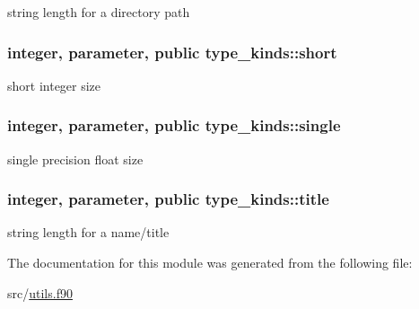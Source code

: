 string length for a directory path 

\hypertarget{classtype__kinds_ab4d7bfce672e6152e78f87f8aa5b2e04}{
\subsubsection[{short}]{\setlength{\rightskip}{0pt plus 5cm}integer, parameter, public type\+\_\+kinds\+::short}}\label{classtype__kinds_ab4d7bfce672e6152e78f87f8aa5b2e04}


short integer size 

\hypertarget{classtype__kinds_a1752925d569776fd4a88872a620ed1d0}{
\subsubsection[{single}]{\setlength{\rightskip}{0pt plus 5cm}integer, parameter, public type\+\_\+kinds\+::single}}\label{classtype__kinds_a1752925d569776fd4a88872a620ed1d0}


single precision float size 

\hypertarget{classtype__kinds_aa2f577aea616d9b9bb91ce438bdf3c02}{
\subsubsection[{title}]{\setlength{\rightskip}{0pt plus 5cm}integer, parameter, public type\+\_\+kinds\+::title}}\label{classtype__kinds_aa2f577aea616d9b9bb91ce438bdf3c02}


string length for a name/title 



The documentation for this module was generated from the following file\+:\begin{DoxyCompactItemize}
\item 
src/\hyperlink{utils_8f90}{utils.\+f90}\end{DoxyCompactItemize}
